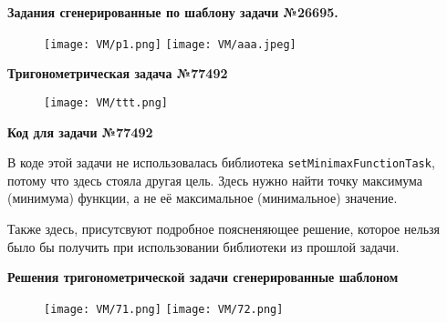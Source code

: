 \textbf{Задания сгенерированные по шаблону задачи №26695.}
	\begin{figure}[h]
		\centering
		\texttt{[image: VM/p1.png]}
		\texttt{[image: VM/aaa.jpeg]}
	\end{figure}

\textbf{Тригонометрическая задача №77492}

	\begin{figure}[h]
		\centering
		\texttt{[image: VM/ttt.png]}
	\end{figure}


\textbf{Код для задачи №77492}




В коде этой задачи не использовалась библиотека \texttt{setMinimaxFunctionTask}, потому что здесь стояла другая цель. Здесь нужно найти точку максимума (минимума) функции, а не её максимальное (минимальное) значение. 

Также здесь, присутсвуют подробное поясненяющее решение, которое нельзя было бы получить при использовании библиотеки из прошлой задачи.

\newpage

\textbf{Решения тригонометрической задачи сгенерированные шаблоном}

	\begin{figure}[h]
		\centering
		\texttt{[image: VM/71.png]}
		\texttt{[image: VM/72.png]}
	\end{figure}
	
